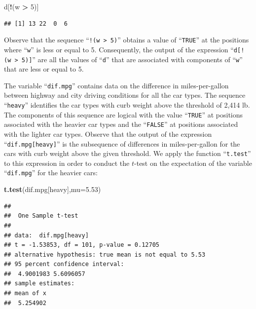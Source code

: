 \documentclass[]{krantz}
\makeatletter
\newenvironment{Shaded}{\begin{snugshade}}{\end{snugshade}}
\newcommand{\KeywordTok}[1]{\textcolor[rgb]{0.13,0.29,0.53}{\textbf{#1}}}
\newcommand{\DataTypeTok}[1]{\textcolor[rgb]{0.13,0.29,0.53}{#1}}
\newcommand{\DecValTok}[1]{\textcolor[rgb]{0.00,0.00,0.81}{#1}}
\newcommand{\FloatTok}[1]{\textcolor[rgb]{0.00,0.00,0.81}{#1}}
\newcommand{\StringTok}[1]{\textcolor[rgb]{0.31,0.60,0.02}{#1}}
\newcommand{\OperatorTok}[1]{\textcolor[rgb]{0.81,0.36,0.00}{\textbf{#1}}}
\newcommand{\NormalTok}[1]{#1}
\newenvironment{kframe}{%
\medskip{}
\setlength{\fboxsep}{.8em}
 \def\at@end@of@kframe{}%
 \ifinner\ifhmode%
  \def\at@end@of@kframe{\end{minipage}}%
  \begin{minipage}{\columnwidth}%
 \fi\fi%
 \def\FrameCommand##1{\hskip\@totalleftmargin \hskip-\fboxsep
 \colorbox{shadecolor}{##1}\hskip-\fboxsep
     \hskip-\linewidth \hskip-\@totalleftmargin \hskip\columnwidth}%
 \MakeFramed {\advance\hsize-\width
   \@totalleftmargin\z@ \linewidth\hsize
   \@setminipage}}%
 {\par\unskip\endMakeFramed%
 \at@end@of@kframe}
\renewenvironment{Shaded}{\begin{kframe}}{\end{kframe}}
\theoremstyle{definition}
\theoremstyle{definition}
\theoremstyle{definition}
\theoremstyle{remark}
\makeatother
\begin{document}
\begin{Shaded}
\begin{Highlighting}[]
\NormalTok{d[}\OperatorTok{!}\NormalTok{(w }\OperatorTok{>}\StringTok{ }\DecValTok{5}\NormalTok{)]}
\end{Highlighting}
\end{Shaded}

\begin{verbatim}
## [1] 13 22  0  6
\end{verbatim}

Observe that the sequence ``\texttt{!(w\ \textgreater{}\ 5)}'' obtains a
value of ``\texttt{TRUE}'' at the positions where ``\texttt{w}'' is less
or equal to 5. Consequently, the output of the expression
``\texttt{d{[}!(w\ \textgreater{}\ 5){]}}'' are all the values of
``\texttt{d}'' that are associated with components of ``\texttt{w}''
that are less or equal to 5.

The variable ``\texttt{dif.mpg}'' contains data on the difference in
miles-per-gallon between highway and city driving conditions for all the
car types. The sequence ``\texttt{heavy}'' identifies the car types with
curb weight above the threshold of 2,414 lb. The components of this
sequence are logical with the value ``\texttt{TRUE}'' at positions
associated with the heavier car types and the ``\texttt{FALSE}'' at
positions associated with the lighter car types. Observe that the output
of the expression ``\texttt{dif.mpg{[}heavy{]}}'' is the subsequence of
differences in miles-per-gallon for the cars with curb weight above the
given threshold. We apply the function ``\texttt{t.test}'' to this
expression in order to conduct the \(t\)-test on the expectation of the
variable ``\texttt{dif.mpg}'' for the heavier cars:

\begin{Shaded}
\begin{Highlighting}[]
\KeywordTok{t.test}\NormalTok{(dif.mpg[heavy],}\DataTypeTok{mu=}\FloatTok{5.53}\NormalTok{)}
\end{Highlighting}
\end{Shaded}

\begin{verbatim}
## 
##  One Sample t-test
## 
## data:  dif.mpg[heavy]
## t = -1.53853, df = 101, p-value = 0.12705
## alternative hypothesis: true mean is not equal to 5.53
## 95 percent confidence interval:
##  4.9001983 5.6096057
## sample estimates:
## mean of x 
##  5.254902
\end{verbatim}
\end{document}
